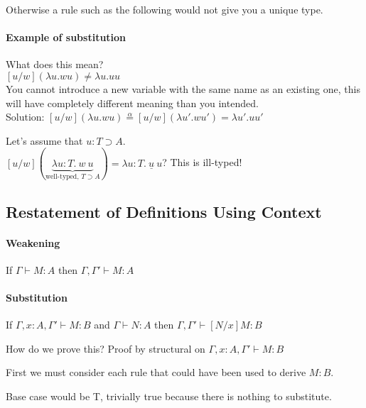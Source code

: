\documentclass[12 pt]{article}
\begin{document}
    \begin{prooftree}
    \end{prooftree}

    Otherwise a rule such as the following would not give you
    a unique type.
    \begin{prooftree}
    \end{prooftree}
    \paragraph{Example of substitution} What does this mean?
    \\ $[u/w] (\lambda u.w u) \neq \lambda u. u u$
    \\ You cannot introduce a new variable with the same name as an
    existing one, this will have completely different meaning than you
    intended.
    \\ Solution: $[u/w](\lambda u. w
    u)\stackrel{\alpha}{=}[u/w](\lambda u'. w u') = \lambda u'. u u'$

    Let's assume that $u : T \supset A$.
    \\ $[u/w](\underbrace{\lambda u : T. \ w \ u}_{\text{well-typed, $T
        \supset A$}}) = \lambda u : T. \ \underline{u} \ u$? This is
    ill-typed!
    \subsection{Restatement of Definitions Using Context}
    \paragraph{Weakening} If $\Gamma \vdash M:A$ then $\Gamma, \Gamma'
    \vdash M:A$
    \paragraph{Substitution} If $\Gamma, x : A , \Gamma' \vdash M : B$
    and $\Gamma \vdash N : A$ then $\Gamma, \Gamma' \vdash [N/x] M : B$

    How do we prove this? Proof by structural on $\Gamma, x: A,
    \Gamma' \vdash M : B$

    First we must consider each rule that could have been used to derive
    $M : B$.

    Base case would be T, trivially true because there is nothing to
    substitute.
\end{document}
